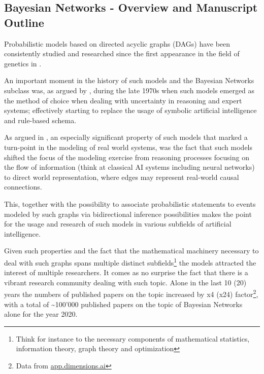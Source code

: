 \documentclass[11pt]{article}
\begin{document}
\begin{article}

\maketitle

\newpage

\tableofcontents
\listoffigures
\listofalgorithms
\listoftables

\newpage

\section{Bayesian Networks - Overview and Manuscript Outline}
\label{sec:org6404f3b}


Probabilistic models based on directed acyclic graphs (DAGs) have
been consistently studied and researched since the first appearance
in the field of genetics in \cite{wright1921correlation}.

An important moment in the history of such models and the Bayesian
Networks subclass was, as argued by \cite{pearl2011bayesian}, during
the late 1970s when such models emerged as the method of choice when
dealing with uncertainty in reasoning and expert systems;
effectively starting to replace the usage of symbolic artificial
intelligence and rule-based schema.

As argued in \cite{pearl2011bayesian}, an especially significant
property of such models that marked a turn-point in the modeling of
real world systems, was the fact that such models shifted the focus
of the modeling exercise from reasoning processes focusing on the
flow of information (think at classical AI systems including neural
networks) to direct world representation, where edges may represent
real-world causal connections.

This, together with the possibility to associate probabilistic
statements to events modeled by such graphs via bidirectional
inference possibilities makes the point for the usage and research
of such models in various subfields of artificial intelligence.

Given such properties and the fact that the mathematical machinery
necessary to deal with such graphs spans multiple distinct
subfields\footnote{Think for instance to the necessary components of mathematical
statistics, information theory, graph theory and optimization} the models attracted the interest of multiple
researchers. It comes as no surprise the fact that there is a
vibrant research community dealing with such topic. Alone in the
last 10 (20) years the numbers of published papers on the topic
increased by x4 (x24) factor\footnote{Data from \href{https://app.dimensions.ai/discover/publication}{app.dimensions.ai}}, with a total of \textasciitilde{}100'000
published papers on the topic of Bayesian Networks alone for the
year 2020.


\end{article}
\end{document}

